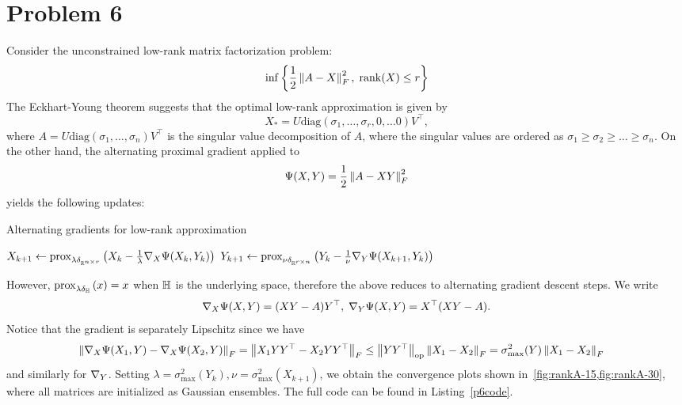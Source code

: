 \documentclass[10pt]{article}
\begin{document}
\section*{Problem 6}
Consider the unconstrained low-rank matrix factorization problem:
\[
    \inf\left\{ \frac{1}{2}\left \| A - X \right \|_F^2, \; \mathrm{rank}(X) \leq r \right\}
\]
The Eckhart-Young theorem suggests that the optimal low-rank approximation is
given by
\[
    X_* = U \mathrm{diag}(\sigma_1, \dots, \sigma_r, 0, \dots 0) V^\top,
\]
where $A = U \mathrm{diag}(\sigma_1, \dots, \sigma_n) V^\top$ is the singular
value
decomposition of $A$, where the singular values are ordered as $\sigma_1 \geq
\sigma_2 \geq \dots \geq \sigma_n$.
On the other hand, the alternating proximal gradient applied to
\[
    \Psi(X, Y) = \frac{1}{2} \left \| A - XY \right \|_F^2
\]
yields the following updates:
\begin{algorithm}
    \caption{Alternating gradients for low-rank approximation}
    \begin{algorithmic}
        \Repeat
            \State $X_{k+1} \gets \mathrm{prox}_{\lambda \delta_{\mathbb{R}^{n \times r}}}\left( 
                X_k - \frac{1}{\lambda} \nabla_X \Psi(X_k, Y_k) \right)$
            \State $Y_{k+1} \gets \mathrm{prox}_{\nu \delta_{\mathbb{R}^{r \times n}}}\left( 
                Y_k - \frac{1}{\nu} \nabla_Y \Psi(X_{k+1}, Y_k) \right)$
    \end{algorithmic}
\end{algorithm}
However, $\mathrm{prox}_{\lambda \delta_{\mathbb{H}}}\left( x \right) = x$ when $\mathbb{H}$ is the underlying
space, therefore the above reduces to alternating gradient descent steps.
We write
\[
    \nabla_X \Psi(X, Y) = (XY - A) Y^\top, \; \nabla_Y \Psi(X, Y) = X^\top (XY -
    A).
\]
Notice that the gradient is separately Lipschitz since we have
\begin{align*}
    \left \| \nabla_{X} \Psi(X_1, Y) - \nabla_X \Psi(X_2, Y) \right \|_F &=
        \left \| X_1 Y Y^\top - X_2 Y Y^\top \right \|_F \leq \left \|  YY^\top  \right \|_{\mathrm{op}}
        \left \| X_1 - X_2 \right \|_F = \sigma_{\max}^2(Y) \left \| X_1 - X_2 \right \|_F
\end{align*}
and similarly for $\nabla_Y$. Setting $\lambda = \sigma_{\max}^2(Y_k), \nu =
\sigma_{\max}^2(X_{k+1})$, we obtain the convergence plots shown
in~\cref{fig:rankA-15,fig:rankA-30}, where all matrices are initialized as
Gaussian ensembles. The full code can be found in Listing~\ref{p6code}.
\end{document}
